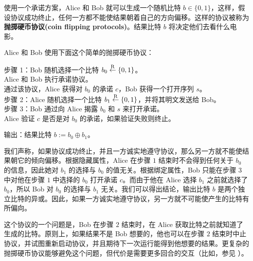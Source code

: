 \begin{snote}[抛掷硬币。]
使用一个承诺方案，Alice 和 Bob 就可以生成一个随机比特 $b\in\{0,1\}$，这样，假设协议成功终止，任何一方都不能使结果朝着自己的方向偏移。这样的协议被称为\textbf{抛掷硬币协议(coin flipping protocols)}。结果比特 $b$ 将决定他们去看什么电影。

Alice 和 Bob 使用下面这个简单的抛掷硬币协议：

\vspace*{10pt}

\hspace*{5pt} 步骤 1：Bob 随机选择一个比特 $b_0\overset{\rm R}\leftarrow\{0,1\}$。\\
\hspace*{66pt} Alice 和 Bob 执行承诺协议。\\
\hspace*{66pt} 通过该协议，Alice 获得对 $b_0$ 的承诺 $c$，Bob 获得一个打开序列 $s$。\\
\hspace*{26pt} 步骤 2：Alice 随机选择一个比特 $b_1\overset{\rm R}\leftarrow\{0,1\}$，并将其明文发送给 Bob。\\
\hspace*{26pt} 步骤 3：Bob 通过向 Alice 揭露 $b_0$ 和 $s$ 来打开承诺。\\
\hspace*{66pt} Alice 验证 $c$ 是否是对 $b_0$ 的承诺，如果验证失败则终止。

\vspace*{5pt}

\hspace*{5pt} 输出：结果比特 $b:=b_0\oplus b_1$。

\vspace*{10pt}

\noindent
我们声称，如果协议成功终止，并且一方诚实地遵守协议，那么另一方就不能使结果朝它的倾向偏移。根据隐藏属性，Alice 在步骤 $1$ 结束时不会得到任何关于 $b_0$ 的信息，因此她对 $b_1$ 的选择与 $b_0$ 的值无关。根据绑定属性，Bob 只能在步骤 $3$ 中对他在步骤 $1$ 中选择的 $b_0$ 打开承诺 $c$。而由于他在 Alice 选择 $b_1$ 之前就选择了 $b_0$，所以 Bob 对 $b_0$ 的选择与 $b_1$ 无关。我们可以得出结论，输出比特 $b$ 是两个独立比特的异或。因此，如果一方诚实地遵守协议，另一方就不可能使产生的比特有所偏向。

这个协议的一个问题是，Bob 在步骤 $2$ 结束时，在 Alice 获取比特之前就知道了生成的比特。原则上，如果结果不是 Bob 想要的，他也可以在步骤 $2$ 结束时中止协议，并试图重新启动协议，并且期待下一次运行能得到他想要的结果。更复杂的抛掷硬币协议能够避免这个问题，但代价是需要更多回合的交互（比如，参见 \cite{moran2009optimally}）。
\end{snote}

